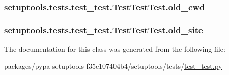 \subsubsection[{old\+\_\+cwd}]{\setlength{\rightskip}{0pt plus 5cm}setuptools.\+tests.\+test\+\_\+test.\+Test\+Test\+Test.\+old\+\_\+cwd}\label{classsetuptools_1_1tests_1_1test__test_1_1TestTestTest_a10f270b031d5f4689e9bbbd3546c5319}
\hypertarget{classsetuptools_1_1tests_1_1test__test_1_1TestTestTest_ae464c55b9d7a0b90db96535f23ca6f12}{}
\subsubsection[{old\+\_\+site}]{\setlength{\rightskip}{0pt plus 5cm}setuptools.\+tests.\+test\+\_\+test.\+Test\+Test\+Test.\+old\+\_\+site}\label{classsetuptools_1_1tests_1_1test__test_1_1TestTestTest_ae464c55b9d7a0b90db96535f23ca6f12}


The documentation for this class was generated from the following file\+:\begin{DoxyCompactItemize}
\item 
packages/pypa-\/setuptools-\/f35c107404b4/setuptools/tests/\hyperlink{test__test_8py}{test\+\_\+test.\+py}\end{DoxyCompactItemize}
